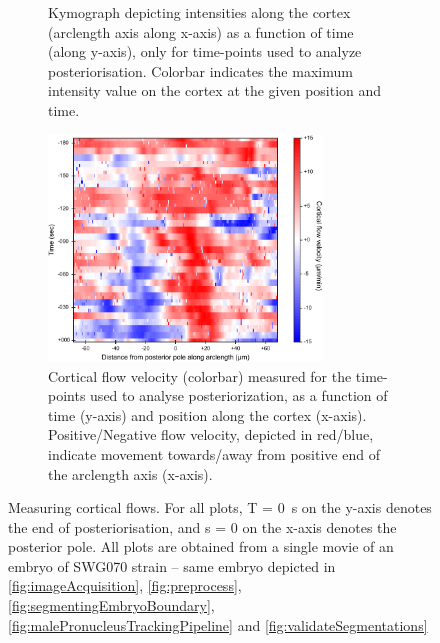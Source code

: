 \begin{figure}[h]
\begin{subfigure}[t]{0.45\textwidth}
    \caption{Kymograph depicting intensities along the cortex (arclength axis along x-axis) as a function of time (along y-axis), only for time-points used to analyze posteriorisation. Colorbar indicates the maximum intensity value on the cortex at the given position and time.} 
    \label{subfig:crtxFlowMeasurement-kymographPosteriorization}
\end{subfigure}

\begin{subfigure}{\textwidth}
    \centering
    \includegraphics[width=0.8\textwidth]{ExpMethods/FigCrtxFlows/crtxFlows.pdf}
    \caption{Cortical flow velocity (colorbar) measured for the time-points used to analyse posteriorization, as a function of time (y-axis) and position along the cortex (x-axis). Positive/Negative flow velocity, depicted in red/blue, indicate movement towards/away from positive end of the arclength axis (x-axis).} 
    \label{subfig:crtxFlowMeasurement-crtxFlows}
\end{subfigure}

\caption[Image analysis: Measuring cortical flows]{Measuring cortical flows. For all plots, T = \SI{0}{\second} on the y-axis denotes the end of posteriorisation, and s = \SI{0}{\unitLength} on the x-axis denotes the posterior pole. All plots are obtained from a single movie of an embryo of SWG070 strain -- same embryo depicted in \autoref{fig:imageAcquisition}, \autoref{fig:preprocess}, \autoref{fig:segmentingEmbryoBoundary}, \autoref{fig:malePronucleusTrackingPipeline} and \autoref{fig:validateSegmentations}}
\label{fig:crtxFlowMeasurement}
\end{figure}

